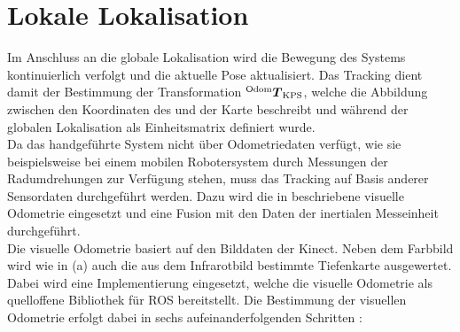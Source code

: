 \section{Lokale Lokalisation}
\label{locloc}
Im Anschluss an die globale Lokalisation wird die Bewegung des Systems kontinuierlich verfolgt und die aktuelle Pose aktualisiert. Das Tracking dient damit der Bestimmung der Transformation ${^{\mathrm{Odom}}\mbox{\boldmath{$T$}}_{\mathrm{KPS}}}$, welche die Abbildung zwischen den Koordinaten des  und der Karte beschreibt und während der globalen Lokalisation als Einheitsmatrix definiert wurde.\\

Da das handgeführte System nicht über Odometriedaten verfügt, wie sie beispielsweise bei einem mobilen Robotersystem durch Messungen der Radumdrehungen zur Verfügung stehen, muss das Tracking auf Basis anderer Sensordaten durchgeführt werden. Dazu wird die in  beschriebene visuelle Odometrie eingesetzt und eine Fusion mit den Daten der inertialen Messeinheit durchgeführt.\\

Die visuelle Odometrie basiert auf den Bilddaten der Kinect. Neben dem Farbbild wird wie in  (a) auch die aus dem Infrarotbild bestimmte Tiefenkarte ausgewertet. Dabei wird eine Implementierung \cite{Fovis} eingesetzt, welche die visuelle Odometrie als quelloffene Bibliothek für ROS bereitstellt. Die Bestimmung der visuellen Odometrie erfolgt dabei in sechs aufeinanderfolgenden Schritten \cite{Huang2011}:

